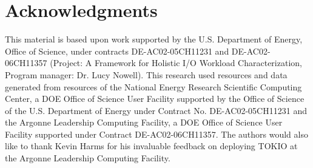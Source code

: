 \section*{Acknowledgments}
This material is based upon work supported by the U.S. Department of Energy,
Office of Science, under contracts DE-AC02-05CH11231 and DE-AC02-06CH11357
(Project: A Framework for Holistic I/O Workload Characterization, Program
manager: Dr. Lucy Nowell).
This research used resources and data generated from resources of the
National Energy Research Scientific Computing Center, a DOE Office of
Science
User Facility supported by the Office of Science of the U.S. Department of
Energy under Contract No. DE-AC02-05CH11231 and the Argonne Leadership
Computing Facility, a DOE Office of Science User Facility supported under
Contract DE-AC02-06CH11357.  The authors would also like to thank Kevin Harms for his invaluable feedback on deploying TOKIO at the Argonne Leadership Computing Facility.
